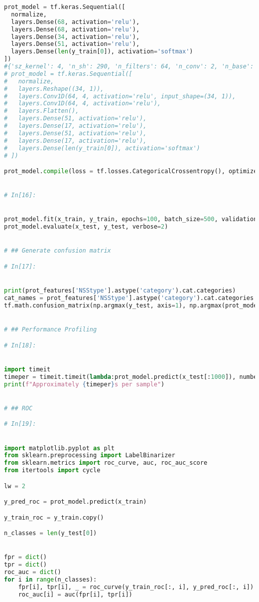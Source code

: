 \documentclass[12pt,letterpaper,oneside,reqno]{book}
\theoremstyle{plain}
\theoremstyle{definition}
\theoremstyle{plain}
\theoremstyle{remark}
\theoremstyle{plain}
\theoremstyle{definition}
\theoremstyle{plain}
\begin{document}
\begin{appendices}
\begin{lstlisting}[language=Python, label=lst:7classfcnnfull, frame=single]
prot_model = tf.keras.Sequential([
  normalize,
  layers.Dense(68, activation='relu'),
  layers.Dense(68, activation='relu'),
  layers.Dense(34, activation='relu'),
  layers.Dense(51, activation='relu'),
  layers.Dense(len(y_train[0]), activation='softmax')
])
#{'sz_kernel': 4, 'n_sh': 290, 'n_filters': 64, 'n_conv': 2, 'n_base': 17}
# prot_model = tf.keras.Sequential([
#   normalize,
#   layers.Reshape((34, 1)),
#   layers.Conv1D(64, 4, activation='relu', input_shape=(34, 1)),
#   layers.Conv1D(64, 4, activation='relu'),
#   layers.Flatten(),
#   layers.Dense(51, activation='relu'),
#   layers.Dense(17, activation='relu'),
#   layers.Dense(51, activation='relu'),
#   layers.Dense(17, activation='relu'),
#   layers.Dense(len(y_train[0]), activation='softmax')
# ])

prot_model.compile(loss = tf.losses.CategoricalCrossentropy(), optimizer=tf.optimizers.Adam(), metrics=['categorical_accuracy'])


# In[16]:


prot_model.fit(x_train, y_train, epochs=100, batch_size=500, validation_data=(x_val, y_val), callbacks = [tf.keras.callbacks.EarlyStopping(patience = 4)])
prot_model.evaluate(x_test, y_test, verbose=2)


# ## Generate confusion matrix

# In[17]:


print(prot_features['NSStype'].astype('category').cat.categories)
cat_names = prot_features['NSStype'].astype('category').cat.categories
tf.math.confusion_matrix(np.argmax(y_test, axis=1), np.argmax(prot_model.predict(x_test), axis=1))


# ## Performance Profiling

# In[18]:


import timeit
timeper = timeit.timeit(lambda:prot_model.predict(x_test[:1000]), number=50)/50000
print(f"Approximately {timeper}s per sample")


# ## ROC

# In[19]:


import matplotlib.pyplot as plt 
from sklearn.preprocessing import LabelBinarizer
from sklearn.metrics import roc_curve, auc, roc_auc_score
from itertools import cycle

lw = 2

y_pred_roc = prot_model.predict(x_train)

y_train_roc = y_train.copy()

n_classes = len(y_test[0])


fpr = dict()
tpr = dict()
roc_auc = dict()
for i in range(n_classes):
    fpr[i], tpr[i], _ = roc_curve(y_train_roc[:, i], y_pred_roc[:, i])
    roc_auc[i] = auc(fpr[i], tpr[i])


\end{lstlisting}
\end{appendices}
\end{document}
